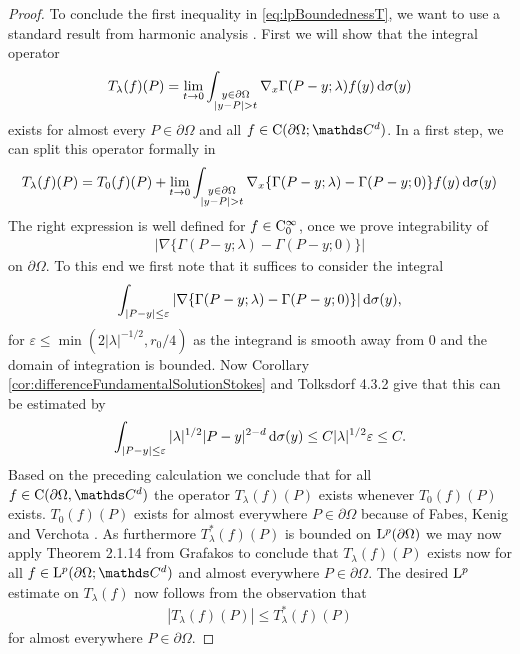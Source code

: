 \begin{proof}
   To conclude the first inequality in \eqref{eq:lpBoundednessT}, we want to use a standard result from harmonic analysis \cite[2.1.14]{grafakos}.
   First we will show that the integral operator
   \begin{align*}
     T_\lambda(f)(P) = \lim_{t \to 0} \int_{\substack{y \in \partial\Omega \\ |y - P| > t}} \nabla_x \Gamma(P - y; \lambda) f(y) \, {\operatorname{d}\!{\sigma}}(y)
   \end{align*}
   exists for almost every $P \in \partial\Omega$ and all $f \in \CC(\partial\Omega; \C^d)$.
   In a first step, we can split this operator formally in
   \begin{align*}
     T_\lambda(f)(P) = T_0(f)(P) + \lim_{t \to 0} \int_{\substack{y \in \partial\Omega \\ |y - P| > t}} \nabla_x \{ \Gamma(P - y; \lambda) - \Gamma(P - y; 0)\}  f(y) \, {\operatorname{d}\!{\sigma}}(y)
   \end{align*}
   The right expression is well defined for $f \in \mathrm{C}_0^\infty$, once we prove integrability of 
   \begin{align*}
     |\nabla \{\Gamma(P - y; \lambda) - \Gamma(P - y; 0)\} |
   \end{align*}
   on $\partial\Omega$.
   To this end we first note that it suffices to consider the integral
   \begin{align*}
     \int_{|P - y| \leq \varepsilon} | \nabla\{ \Gamma(P - y; \lambda) - \Gamma(P - y; 0) \} | \, {\operatorname{d}\!{\sigma}}(y), 
   \end{align*}
   for $\varepsilon \leq \min(2|\lambda|^{-1/2}, r_0/4)$ as the integrand is smooth away from $0$ and the domain of integration is bounded.
   Now Corollary \ref{cor:differenceFundamentalSolutionStokes} and Tolksdorf 4.3.2 give that this can be estimated by
   \begin{align*}
     \int_{|P - y| \leq \varepsilon} |\lambda|^{1/2} |P - y|^{2 - d} \, {\operatorname{d}\!{\sigma}}(y) \leq C |\lambda|^{1/2} \varepsilon \leq C.
   \end{align*}
   Based on the preceding calculation we conclude that for all $f \in \CC(\partial\Omega,\C^d)$ the operator $T_\lambda(f)(P)$ exists whenever $T_0(f)(P)$ exists.
   $T_0(f)(P)$ exists for almost everywhere $P \in \partial\Omega$ because of Fabes, Kenig and Verchota \cite{fabesKenigVerchota}.
   As furthermore $T_\lambda^*(f)(P)$ is bounded on $\mathrm{L}^p(\partial\Omega)$  we may now apply Theorem 2.1.14 from Grafakos \cite{grafakos} to conclude that $T_\lambda(f)(P)$ exists now for all $f \in \Ell^p(\partial\Omega; \C^d)$ and almost everywhere $P \in \partial\Omega$.
   The desired $\mathrm{L}^p$ estimate on $T_\lambda(f)$ now follows from the observation that 
   \begin{align*}
     | T_\lambda(f)(P) | \leq T_\lambda^*(f)(P)
   \end{align*}
   for almost everywhere $P \in \partial\Omega$.
\end{proof}

